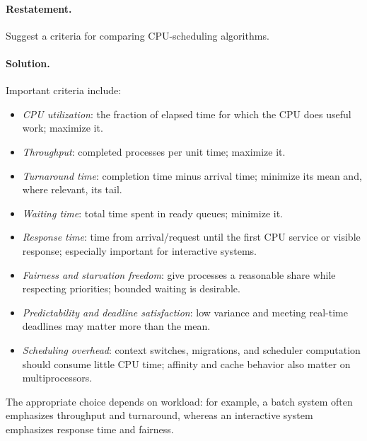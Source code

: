 \paragraph{Restatement.}
Suggest a criteria for comparing CPU-scheduling algorithms.

\paragraph{Solution.}
Important criteria include:
\begin{itemize}
  \item \emph{CPU utilization}: the fraction of elapsed time for which
        the CPU does useful work; maximize it.
  \item \emph{Throughput}: completed processes per unit time; maximize
        it.
  \item \emph{Turnaround time}: completion time minus arrival time;
        minimize its mean and, where relevant, its tail.
  \item \emph{Waiting time}: total time spent in ready queues; minimize
        it.
  \item \emph{Response time}: time from arrival/request until the first
        CPU service or visible response; especially important for
        interactive systems.
  \item \emph{Fairness and starvation freedom}: give processes a
        reasonable share while respecting priorities; bounded waiting
        is desirable.
  \item \emph{Predictability and deadline satisfaction}: low variance
        and meeting real-time deadlines may matter more than the mean.
  \item \emph{Scheduling overhead}: context switches, migrations, and
        scheduler computation should consume little CPU time; affinity
        and cache behavior also matter on multiprocessors.
\end{itemize}
The appropriate choice depends on workload: for example, a batch
system often emphasizes throughput and turnaround, whereas an
interactive system emphasizes response time and fairness.

